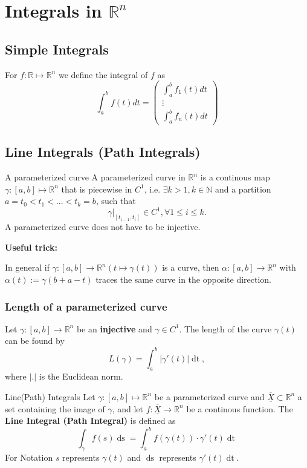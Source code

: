 \documentclass[a4paper,fontsize = 10pt]{article}
\def\R{\mathbb{R}}
\def\N{\mathbb{N}}
\def\X{\underline{\overline{X}}}
\begin{document}
\section{Integrals in \texorpdfstring{\(\R^n\)}{Rⁿ}}
\subsection{Simple Integrals}
For \(f: \R \mapsto \R^n\) we define the integral of $f$ as
\[\int_a^b f(t)dt = 
\begin{pmatrix*}
  \int_a^b f_1(t) dt \\
  \vdots\\
  \int_a^b f_n(t) dt
\end{pmatrix*}
\]

\subsection{Line Integrals (Path Integrals)}
\begin{mainbox}{A parameterized curve}
    A parameterized curve in \(\R^n\) is a continous map \(\gamma: \left[a,b\right] \mapsto \R^n\) that is piecewise in \(C^1\), 
    i.e. \(\exists k > 1, k \in \N\) and a partition \(a = t_0 < t_1 < ... < t_k = b\), such that 
    \[\gamma|_{[t_{i-1}, t_i]} \in C^1, \forall 1 \leq i \leq k.\] 
    A parameterized curve does not have to be injective.
  \end{mainbox}
  \textbf{Useful trick:}

  In general if $\gamma: [a, b] \to \R^n (t \mapsto \gamma(t))$ is a curve, then $\alpha: [a,b] \to \R^n$ with $\alpha(t) := \gamma(b+a - t)$ traces the same curve in the opposite direction. 
  
  \subsubsection*{Length of a parameterized curve}
  Let $\gamma: [a, b] \to \R^n$ be an \textbf{injective} and $\gamma \in C^1$. The length of the curve $\gamma(t)$ can be found by 
  \[L(\gamma) = \int_a^b |\gamma'(t)|\mathop{dt},\] where $|.|$ is the Euclidean norm.

\begin{mainbox}{Line(Path) Integrals}
    Let \(\gamma : \left[a,b\right] \mapsto \R^n\) be a parameterized curve and \(\X \subset \R^n\) a set containing the image of $\gamma$, and let $f: \X \to \R^n$ be a continous function. The \textbf{Line Integral (Path Integral)} is defined as 
    \[\int_\gamma f(s) \mathop{ds} = \int_a^b f(\gamma(t)) \cdot \gamma'(t) \mathop{dt}\]
    For Notation $s$ represents $\gamma(t)$ and $\mathop{ds}$ represents $\gamma'(t)\mathop{dt}$.
\end{mainbox}
\end{document}
